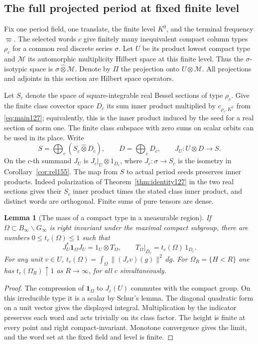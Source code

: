 \documentclass[a4paper,11pt]{article}
\newtheorem{lemma}[proposition]{Lemma}
\theoremstyle{definition}
\theoremstyle{remark}
\numberwithin{equation}{section}
\begin{document}
\subsection{The full projected period at fixed finite level}\label{nav:VII-08}
\label{sec:adjoint157}

Fix one period field, one translate, the finite level \(K^0\),
and the terminal frequency \(\varpi\). The selected words \(c\)
give finitely many inequivalent compact column types \(\rho_c\)
for a common real discrete series \(\sigma\). Let \(U\) be its
product lowest compact type and \(\mathcal M\) its automorphic
multiplicity Hilbert space at this finite level. Thus the
\(\sigma\)-isotypic space is \(\sigma\widehat\otimes\mathcal M\).
Denote by \(\Pi\) the projection onto \(U\otimes\mathcal M\).
All projections and adjoints in this section are Hilbert space
operators.

Let \(S_c\) denote the space of square-integrable real Bessel
sections of type \(\rho_c\). Give the finite class covector space
\(D_c\) its sum inner product multiplied by \(c_{\rho_c,K^0}\)
from \eqref{eq:main127}; equivalently, this is the inner product
induced by the seed for a real section of norm one. The finite
class subspace with zero sums on scalar orbits can be used in
its place. Write
\[
     S=\bigoplus_c (S_c\widehat\otimes D_c),\qquad
     D=\bigoplus_c D_c,\qquad
     J_U:U\otimes D\longrightarrow S .
\]
On the \(c\)-th summand \(J_U\) is \(J_c|_U\otimes 1_{D_c}\),
where \(J_c:\sigma\to S_c\) is the isometry in
Corollary~\ref{cor:rel155}. The map from \(S\) to actual
period seeds preserves inner products. Indeed polarization of
Theorem~\ref{thm:identity127} in the two real sections gives
their \(S_c\) inner product times the stated class inner product,
and distinct words are orthogonal. Finite sums of pure tensors
are dense.

\begin{lemma}[The mass of a compact type in a measurable region]
\label{lem:weights157}
If \(\Omega\subset B_\infty\backslash G_\infty\) is right
invariant under the maximal compact subgroup, there are
numbers \(0\le t_c(\Omega)\le1\) such that
\[
  J_U^*\mathbf1_\Omega J_U=1_U\otimes T_\Omega,\qquad
  T_\Omega|_{D_c}=t_c(\Omega)\,1_{D_c}.
\]
For any unit \(v\in U\),
\(t_c(\Omega)=\int_\Omega\|(J_cv)(g)\|^2\,d\dot g\).
For \(\Omega_R=\{H<R\}\) one has \(t_c(\Omega_R)\uparrow1\)
as \(R\to\infty\), for all \(c\) simultaneously.
\end{lemma}
\begin{proof}
The compression of \(\mathbf1_\Omega\) to \(J_c(U)\)
commutes with the compact group. On this irreducible type it
is a scalar by Schur's lemma. The diagonal quadratic form
on a unit vector gives the displayed integral. Multiplication
by the indicator preserves each word and acts trivially on
its class factor. The height is finite at every point and
right compact-invariant. Monotone convergence gives the limit,
and the word set at the fixed field and level is finite.
\end{proof}
\end{document}
